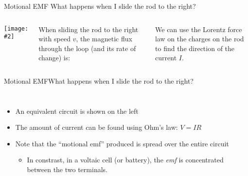 \documentclass[12pt,aspectratio=169]{beamer}
\newcommand{\pic}[2]{\texttt{[image: \#2]}}
\begin{document}
\begin{frame}{Motional EMF}
  {What happens when I slide the rod to the right?}
  \begin{columns}
    \pic{1}{motional-emf-1}

    When sliding the rod to the right with speed $v$, the magnetic flux through
    the loop (and its rate of change) is:

    
    \vspace{-.3in}We can use the Lorentz force law on the charges on the rod to
    find the direction of the current $I$.
  \end{columns}
\end{frame}



\begin{frame}{Motional EMF}{What happens when I slide the rod to the right?}
  \begin{columns}
    
    \begin{itemize}
    \item An equivalent circuit is shown on the left
    \item The amount of current can be found using Ohm's law: $V=IR$
    \item Note that the ``motional emf'' produced is spread over the entire
      circuit
      \begin{itemize}
      \item In constrast, in a voltaic cell (or battery), the \emph{emf} is
        concentrated between the two terminals.
      \end{itemize}
    \end{itemize}
  \end{columns}
\end{frame}
\end{document}

